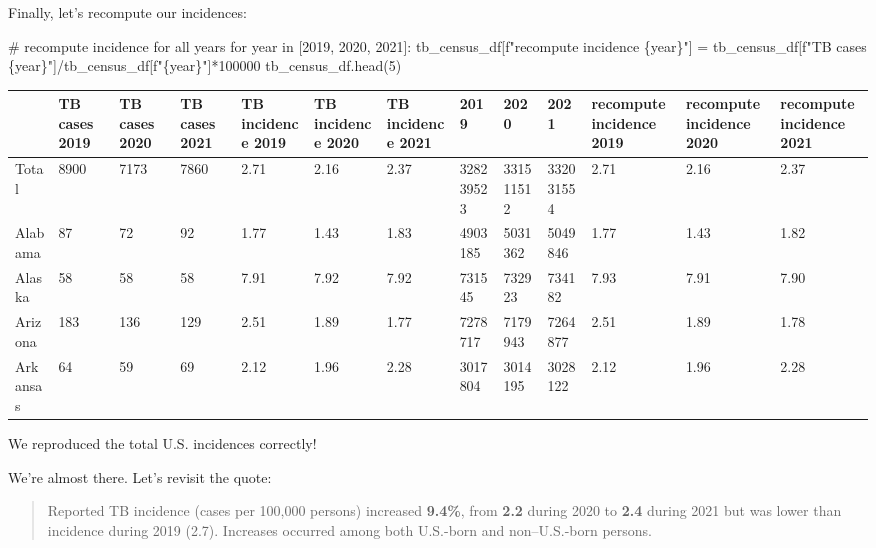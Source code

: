 \documentclass[
  letterpaper,
  DIV=11,
  numbers=noendperiod]{scrreprt}
\newenvironment{Shaded}{\begin{snugshade}}{\end{snugshade}}
\newcommand{\CommentTok}[1]{\textcolor[rgb]{0.37,0.37,0.37}{#1}}
\newcommand{\ControlFlowTok}[1]{\textcolor[rgb]{0.00,0.23,0.31}{#1}}
\newcommand{\DecValTok}[1]{\textcolor[rgb]{0.68,0.00,0.00}{#1}}
\newcommand{\KeywordTok}[1]{\textcolor[rgb]{0.00,0.23,0.31}{#1}}
\newcommand{\NormalTok}[1]{\textcolor[rgb]{0.00,0.23,0.31}{#1}}
\newcommand{\OperatorTok}[1]{\textcolor[rgb]{0.37,0.37,0.37}{#1}}
\newcommand{\SpecialCharTok}[1]{\textcolor[rgb]{0.37,0.37,0.37}{#1}}
\newcommand{\SpecialStringTok}[1]{\textcolor[rgb]{0.13,0.47,0.30}{#1}}
\begin{document}
Finally, let's recompute our incidences:

\begin{Shaded}
\begin{Highlighting}[]
\CommentTok{\# recompute incidence for all years}
\ControlFlowTok{for}\NormalTok{ year }\KeywordTok{in}\NormalTok{ [}\DecValTok{2019}\NormalTok{, }\DecValTok{2020}\NormalTok{, }\DecValTok{2021}\NormalTok{]:}
\NormalTok{    tb\_census\_df[}\SpecialStringTok{f"recompute incidence }\SpecialCharTok{\{}\NormalTok{year}\SpecialCharTok{\}}\SpecialStringTok{"}\NormalTok{] }\OperatorTok{=}\NormalTok{ tb\_census\_df[}\SpecialStringTok{f"TB cases }\SpecialCharTok{\{}\NormalTok{year}\SpecialCharTok{\}}\SpecialStringTok{"}\NormalTok{]}\OperatorTok{/}\NormalTok{tb\_census\_df[}\SpecialStringTok{f"}\SpecialCharTok{\{}\NormalTok{year}\SpecialCharTok{\}}\SpecialStringTok{"}\NormalTok{]}\OperatorTok{*}\DecValTok{100000}
\NormalTok{tb\_census\_df.head(}\DecValTok{5}\NormalTok{)}
\end{Highlighting}
\end{Shaded}

\begin{longtable}[]{@{}lllllllllllll@{}}
\toprule\noalign{}
& TB cases 2019 & TB cases 2020 & TB cases 2021 & TB incidence 2019 & TB
incidence 2020 & TB incidence 2021 & 2019 & 2020 & 2021 & recompute
incidence 2019 & recompute incidence 2020 & recompute incidence 2021 \\
\midrule\noalign{}
\endhead
\bottomrule\noalign{}
\endlastfoot
Total & 8900 & 7173 & 7860 & 2.71 & 2.16 & 2.37 & 328239523 & 331511512
& 332031554 & 2.71 & 2.16 & 2.37 \\
Alabama & 87 & 72 & 92 & 1.77 & 1.43 & 1.83 & 4903185 & 5031362 &
5049846 & 1.77 & 1.43 & 1.82 \\
Alaska & 58 & 58 & 58 & 7.91 & 7.92 & 7.92 & 731545 & 732923 & 734182 &
7.93 & 7.91 & 7.90 \\
Arizona & 183 & 136 & 129 & 2.51 & 1.89 & 1.77 & 7278717 & 7179943 &
7264877 & 2.51 & 1.89 & 1.78 \\
Arkansas & 64 & 59 & 69 & 2.12 & 1.96 & 2.28 & 3017804 & 3014195 &
3028122 & 2.12 & 1.96 & 2.28 \\
\end{longtable}

We reproduced the total U.S. incidences correctly!

We're almost there. Let's revisit the quote:

\begin{quote}
Reported TB incidence (cases per 100,000 persons) increased
\textbf{9.4\%}, from \textbf{2.2} during 2020 to \textbf{2.4} during
2021 but was lower than incidence during 2019 (2.7). Increases occurred
among both U.S.-born and non--U.S.-born persons.
\end{quote}
\end{document}
